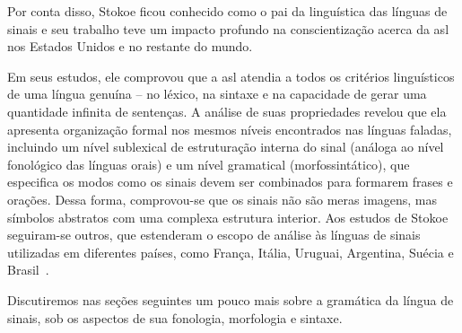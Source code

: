 Por conta disso, Stokoe ficou conhecido como o pai da linguística das línguas de sinais e seu trabalho teve um impacto profundo na conscientização acerca da \acrshort{asl} nos Estados Unidos e no restante do mundo.

Em seus estudos, ele comprovou que a \acrshort{asl} atendia a todos os critérios linguísticos de uma língua genuína -- no léxico, na sintaxe e na capacidade de  gerar uma quantidade infinita de sentenças.
A análise de suas propriedades revelou que ela apresenta organização formal nos mesmos níveis encontrados nas línguas faladas, incluindo um nível sublexical de estruturação interna do sinal (análoga ao nível fonológico das línguas orais) e um nível gramatical (morfossintático), que especifica os modos como os sinais devem ser combinados para formarem frases e orações. Dessa forma, comprovou-se que os sinais não são meras imagens, mas símbolos abstratos com uma complexa estrutura interior. Aos estudos de Stokoe seguiram-se outros, que estenderam o escopo de análise às línguas de sinais utilizadas em diferentes países, como França, Itália, Uruguai, Argentina, Suécia e Brasil~\cite{stokoe-1960-sl-structure,quadros-2004-estudos-linguisticos, pereira-2011-conhecimento-alem-sinais}.

Discutiremos nas seções seguintes um pouco mais sobre a gramática da língua de sinais, sob os aspectos de sua fonologia, morfologia e sintaxe.






